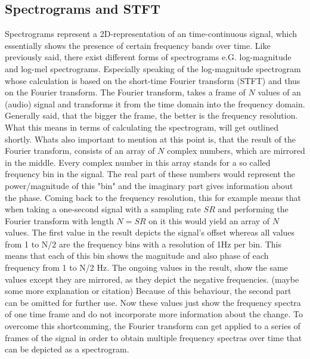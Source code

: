 \subsection{Spectrograms and STFT}
Spectrograms represent a 2D-representation of an time-continuous signal, which essentially shows the presence of certain frequency bands over time. Like previously said, there exist different forms of spectrograms e.G. log-magnitude and log-mel spectrograms. Especially speaking of the log-magnitude spectrogram whose calculation is based on the short-time Fourier transform (STFT) and thus on the Fourier transform. The Fourier transform, takes a frame of $N$ values of an (audio) signal and transforms it from the time domain into the frequency domain. Generally said, that the bigger the frame, the better is the frequency resolution. What this means in terms of calculating the spectrogram, will get outlined shortly. Whats also important to mention at this point is, that the result of the Fourier transform, consists of an array of $N$ complex numbers, which are mirrored in the middle. Every complex number in this array stands for a so called frequency bin in the signal. The real part of these numbers would represent the power/magnitude of this "bin" and the imaginary part gives information about the phase. Coming back to the frequency resolution, this for example means that when taking a one-second signal with a sampling rate $SR$ and performing the Fourier transform with length $N=SR$ on it this would yield an array of $N$ values. The first value in the result depicts the signal's offset whereas all values from 1 to N/2 are the frequency bins with a resolution of 1Hz per bin. This means that each of this bin shows the magnitude and also phase of each frequency from 1 to N/2 Hz. The ongoing values in the result, show the same values except they are mirrored, as they depict the negative frequencies. (maybe some more explanation or citation) Because of this behaviour, the second part can be omitted for further use. Now these values just show the frequency spectra of one time frame and do not incorporate more information about the change. To overcome this shortcomming, the Fourier transform can get applied to a series of frames of the signal in order to obtain multiple frequency spectras over time that can be depicted as a spectrogram.\\

